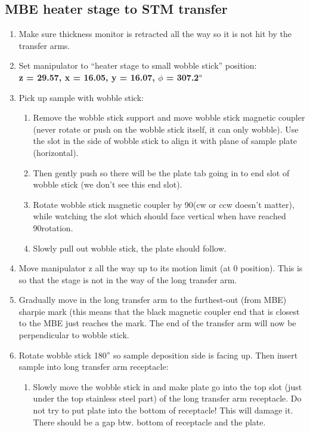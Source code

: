 \subsection{MBE heater stage to STM transfer}
\begin{enumerate}
	\item	Make sure thickness monitor is retracted all the way so it is not hit by the transfer arms.
     \item Set manipulator to “heater stage to small wobble stick” position:\\
     \textbf{z = 29.57, x = 16.05, y = 16.07, $\phi$ = 307.2$\degree$}
	\item	Pick up sample with wobble stick: 
	\begin{enumerate}
	\item	Remove the wobble stick support and move wobble stick magnetic coupler (never rotate or push on the wobble stick itself, it can only wobble).  Use the slot in the side of wobble stick to align it with plane of sample plate (horizontal). 
	\item	Then gently push so there will be the plate tab going in to end slot of wobble stick (we don’t see this end slot). 
	\item	Rotate wobble stick magnetic coupler by 90\degree (cw or ccw doesn’t matter), while watching the slot which should face vertical when have reached 90\degree rotation.
	\item	Slowly pull out wobble stick, the plate should follow.
	\end{enumerate}
\item	Move manipulator z all the way up to its motion limit (at 0 position). This is so that the stage is not in the way of the long transfer arm.
\item	Gradually move in the long transfer arm to the furthest-out (from MBE) sharpie mark (this means that the black magnetic coupler end that is closest to the MBE just reaches the mark. The end of the transfer arm will now be perpendicular to wobble stick.
\item Rotate wobble stick 180$\degree$ so sample deposition side is facing up. Then insert sample into long transfer arm receptacle:
\begin{enumerate}
	\item	Slowly move the wobble stick in and make plate go into the top slot (just under the top stainless steel part) of the long transfer arm receptacle. Do not try to put plate into the bottom of receptacle! This will damage it. There should be a gap btw. bottom of receptacle and the plate. 

\end{enumerate}
\end{enumerate}
